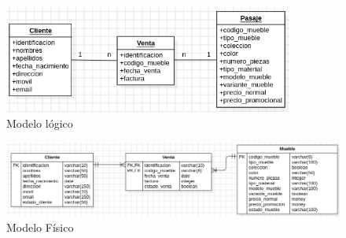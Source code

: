 \documentclass[12pt]{article}
\begin{document}
                        \begin{figure}[!h]
                                \centering
                                \includegraphics[width=0.85\textwidth]{img/ej3-2.png}
                                \caption{Modelo lógico}
                        \end{figure}

                        \newpage
                        \begin{figure}[!h]
                                \centering
                                \includegraphics[width=1\textwidth]{img/ej3-3.png}
                                \caption{Modelo Físico}
                        \end{figure}



        \newpage
\end{document}
